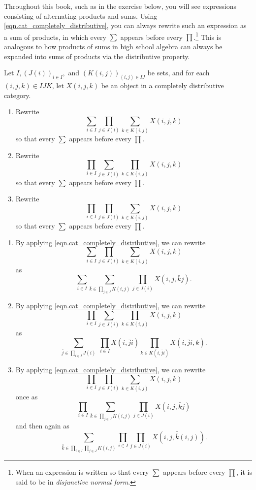 \documentclass[Book-Poly]{subfiles}
\begin{document}
Throughout this book, such as in the exercise below, you will see expressions consisting of alternating products and sums.
Using \eqref{eqn.cat_completely_distributive}, you can always rewrite such an expression as a sum of products, in which every $\sum$ appears before every $\prod$.\footnote{When an expression is written so that every $\sum$ appears before every $\prod$, it is said to be in \emph{disjunctive normal form}.}
This is analogous to how products of sums in high school algebra can always be expanded into sums of products via the distributive property.

\begin{exercise} \label{exc.push_prod_sum_set}
    Let $I, (J(i))_{i\in I},$ and $(K(i,j))_{(i,j)\in IJ}$ be sets, and for each $(i,j,k)\in IJK$, let $X(i,j,k)$ be an object in a completely distributive category.
    \begin{enumerate}
        \item Rewrite
        \[
        \sum_{i\in I}\prod_{j\in J(i)}\sum_{k\in K(i,j)}X(i,j,k)
        \]
        so that every $\sum$ appears before every $\prod$.
        \item Rewrite
        \[
        \prod_{i\in I}\sum_{j\in J(i)}\prod_{k\in K(i,j)}X(i,j,k)
        \]
        so that every $\sum$ appears before every $\prod$.
        \item Rewrite
        \[
        \prod_{i\in I}\prod_{j\in J(i)}\sum_{k\in K(i,j)}X(i,j,k)
        \]
        so that every $\sum$ appears before every $\prod$.\qedhere
    \end{enumerate}
    \begin{solution}
        \begin{enumerate}
            \item By applying \eqref{eqn.cat_completely_distributive}, we can rewrite
            \[
            \sum_{i\in I}\prod_{j\in J(i)}\sum_{k\in K(i,j)}X(i,j,k)
            \]
            as
            \[
            \sum_{i\in I}\sum_{\bar{k}\in \prod_{j\in J}K(i,j)}\prod_{j\in J(i)}X(i,j,\bar{k}j).
            \]
            \item By applying \eqref{eqn.cat_completely_distributive}, we can rewrite
            \[
            \prod_{i\in I}\sum_{j\in J(i)}\prod_{k\in K(i,j)}X(i,j,k)
            \]
            as
            \[
            \sum_{\bar{j}\in \prod_{i\in I}J(i)}\;\prod_{i\in I}X(i,\bar{j}i)\prod_{k\in K(i,\bar{j}i)}X(i,\bar{j}i,k).
            \]
            \item By applying \eqref{eqn.cat_completely_distributive}, we can rewrite
            \[
            \prod_{i\in I}\prod_{j\in J(i)}\sum_{k\in K(i,j)}X(i,j,k)
            \]
            once as
            \[
            \prod_{i\in I}\sum_{\bar{k}\in\prod_{j\in J}K(i,j)}\prod_{j\in J(i)}X(i,j,\bar{k}j)
            \]
            and then again as
            \[
            \sum_{\bar{\bar{k}}\in\prod_{i\in I}\prod_{j\in J}K(i,j)}\prod_{i\in I}\prod_{j\in J(i)}X(i,j,\bar{\bar{k}}(i,j)).
            \]
        \end{enumerate}
    \end{solution}
\end{exercise}
\end{document}
